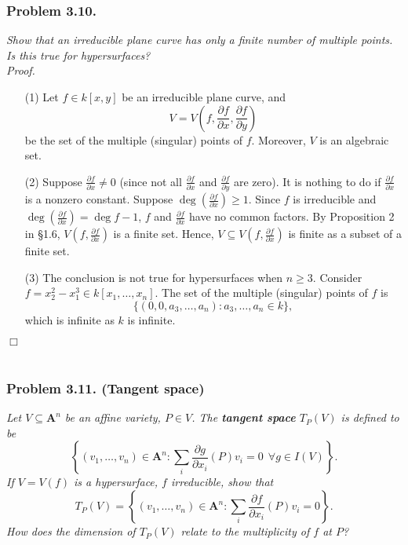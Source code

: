 \documentclass{article}
\begin{document}
\subsubsection*{Problem 3.10.}
\emph{Show that an irreducible plane curve has only a finite number of multiple points.
Is this true for hypersurfaces?} \\



\emph{Proof.}
\begin{enumerate}
\item[(1)]
  Let $f \in k[x,y]$ be an irreducible plane curve, and
  \[
    V
    = V\left( f, \frac{\partial f}{\partial x}, \frac{\partial f}{\partial y} \right)
  \]
  be the set of the multiple (singular) points of $f$.
  Moreover, $V$ is an algebraic set.

\item[(2)]
  Suppose $\frac{\partial f}{\partial x} \neq 0$
  (since not all $\frac{\partial f}{\partial x}$ and $\frac{\partial f}{\partial y}$ are zero).
  It is nothing to do if $\frac{\partial f}{\partial x}$ is a nonzero constant.
  Suppose $\deg(\frac{\partial f}{\partial x}) \geq 1$.
  Since $f$ is irreducible and $\deg\left( \frac{\partial f}{\partial x} \right) = \deg f - 1$,
  $f$ and $\frac{\partial f}{\partial x}$ have no common factors.
  By Proposition 2 in \S 1.6,
  $V\left( f, \frac{\partial f}{\partial x} \right)$ is a finite set.
  Hence,
  $V \subseteq V\left( f, \frac{\partial f}{\partial x} \right)$ is finite
  as a subset of a finite set.

\item[(3)]
  The conclusion is not true for hypersurfaces when $n \geq 3$.
  Consider $f = x_2^2 - x_1^3 \in k[x_1,\ldots,x_n]$.
  The set of the multiple (singular) points of $f$ is
  \[
    \{ (0,0,a_3,\ldots,a_n) : a_3,\ldots,a_n \in k \},
  \]
  which is infinite as $k$ is infinite.
\end{enumerate}
$\Box$ \\\\






\subsubsection*{Problem 3.11. (Tangent space)}
\emph{Let $V \subseteq \mathbf{A}^{n}$ be an affine variety, $P \in V$.
The \textbf{tangent space} $T_P(V)$ is defined to be
\[
  \left\{
    (v_1, \ldots, v_n) \in \mathbf{A}^{n} :
    \sum_i \frac{\partial g}{\partial x_i}(P) v_i = 0 \:\: \forall g \in I(V)
  \right\}.
\]
If $V = V(f)$ is a hypersurface, $f$ irreducible, show that
\[
  T_P(V)
  =
  \left\{
    (v_1, \ldots, v_n) \in \mathbf{A}^{n} :
    \sum_i \frac{\partial f}{\partial x_i}(P) v_i = 0
  \right\}.
\]
How does the dimension of $T_P(V)$ relate to the multiplicity of $f$ at $P$?} \\
\end{document}
